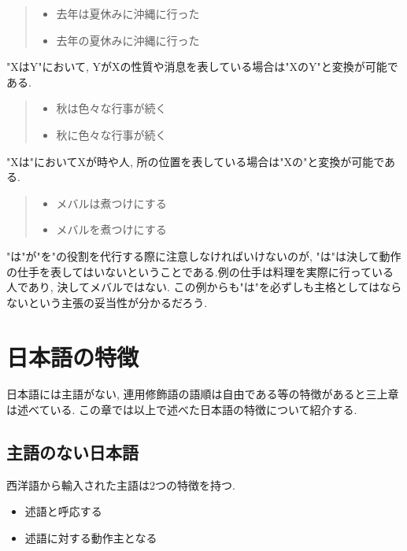 \documentclass{jreport}
\begin{document}
\begin{quote}
 \begin{itemize}
  \item 去年は夏休みに沖縄に行った
  \item 去年の夏休みに沖縄に行った
 \end{itemize}
\end{quote}

"XはY"において, YがXの性質や消息を表している場合は"XのY"と変換が可能である.

\begin{quote}
 \begin{itemize}
  \item 秋は色々な行事が続く
  \item 秋に色々な行事が続く
 \end{itemize}
\end{quote}
   
"Xは"においてXが時や人, 所の位置を表している場合は"Xの"と変換が可能である.

\begin{quote}
 \begin{itemize}
  \item メバルは煮つけにする
  \item メバルを煮つけにする
 \end{itemize}
\end{quote}

"は"が"を"の役割を代行する際に注意しなければいけないのが, 
"は"は決して動作の仕手を表してはいないということである.例の仕手は料理を実際に行っている人であり, 
決してメバルではない. この例からも"は"を必ずしも主格としてはならないという主張の妥当性が分かるだろう.

\chapter{日本語の特徴}
日本語には主語がない, 連用修飾語の語順は自由である等の特徴があると三上章は述べている.
この章では以上で述べた日本語の特徴について紹介する.
\section{主語のない日本語}
西洋語から輸入された主語は2つの特徴を持つ.

\begin{itemize}
 \item 述語と呼応する
 \item 述語に対する動作主となる
\end{itemize}
\end{document}
